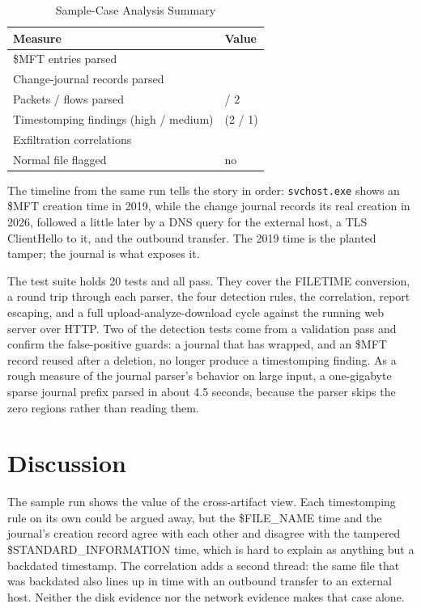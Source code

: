 \documentclass[12pt,onecolumn]{IEEEtran}
\begin{document}
\begin{table}[htbp]
\centering
\caption{Sample-Case Analysis Summary}
\label{tab:results}
\begin{tabular}{p{}
                >{\centering\arraybackslash}p{}}
\toprule
\textbf{Measure} & \textbf{Value} \\
\midrule
\$MFT entries parsed                 & 2 \\
Change-journal records parsed        & 4 \\
Packets / flows parsed               & 122 / 2 \\
Timestomping findings (high / medium) & 3 (2 / 1) \\
Exfiltration correlations            & 2 \\
Normal file flagged                  & no \\
\bottomrule
\end{tabular}
\end{table}

The timeline from the same run tells the story in order: \texttt{svchost.exe} shows an \$MFT creation time in 2019, while the change journal records its real creation in 2026, followed a little later by a DNS query for the external host, a TLS ClientHello to it, and the outbound transfer. The 2019 time is the planted tamper; the journal is what exposes it.

The test suite holds 20 tests and all pass. They cover the FILETIME conversion, a round trip through each parser, the four detection rules, the correlation, report escaping, and a full upload-analyze-download cycle against the running web server over HTTP. Two of the detection tests come from a validation pass and confirm the false-positive guards: a journal that has wrapped, and an \$MFT record reused after a deletion, no longer produce a timestomping finding. As a rough measure of the journal parser's behavior on large input, a one-gigabyte sparse journal prefix parsed in about 4.5 seconds, because the parser skips the zero regions rather than reading them.

\section{Discussion}
The sample run shows the value of the cross-artifact view. Each timestomping rule on its own could be argued away, but the \$FILE\_NAME time and the journal's creation record agree with each other and disagree with the tampered \$STANDARD\_INFORMATION time, which is hard to explain as anything but a backdated timestamp. The correlation adds a second thread: the same file that was backdated also lines up in time with an outbound transfer to an external host. Neither the disk evidence nor the network evidence makes that case alone.
\end{document}
